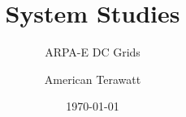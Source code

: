 \documentclass[aspectratio=169,11pt]{beamer}
\title{System Studies}
\subtitle{ARPA-E DC Grids}
\author{American Terawatt}
\date{\today}
\begin{document}
\titleslide


\end{document}
